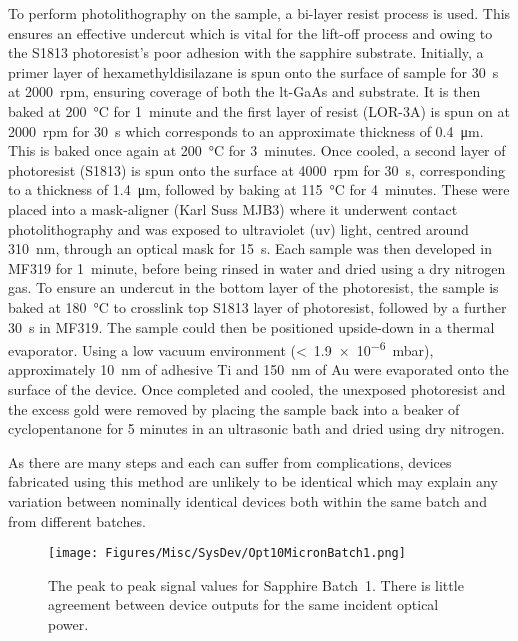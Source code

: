 To perform photolithography on the sample, a bi\nobreakdash-layer resist process is used. This ensures an effective undercut which is vital for the lift\nobreakdash-off process and owing to the S1813 photoresist's poor adhesion with the sapphire substrate. Initially, a primer layer of hexamethyldisilazane is spun onto the surface of sample for \SI{30}{s} at \SI{2000}{rpm}, ensuring coverage of both the \acrshort{lt}\nobreakdash-GaAs and substrate. It is then baked at \SI{200}{\celsius} for \SI{1}{minute} and the first layer of resist (LOR\nobreakdash-3A) is spun on at \SI{2000}{rpm} for \SI{30}{s} which corresponds to an approximate thickness of \SI{0.4}{\micro\metre}. This is baked once again at \SI{200}{\celsius} for \SI{3}{minutes}. Once cooled, a second layer of photoresist (S1813) is spun onto the surface at \SI{4000}{rpm} for \SI{30}{s}, corresponding to a thickness of \SI{1.4}{\micro\metre}, followed by baking at \SI{115}{\celsius} for \SI{4}{minutes}. These were placed into a mask\nobreakdash-aligner (Karl Suss MJB3) where it underwent contact photolithography and was exposed to ultraviolet (\acrshort{uv}) light, centred around \SI{310}{nm}, through an optical mask for \SI{15}{s}. Each sample was then developed in MF319 for \SI{1}{minute}, before being rinsed in water and dried using a dry nitrogen gas. 
To ensure an undercut in the bottom layer of the photoresist, the sample is baked at \SI{180}{\celsius} to crosslink top S1813 layer of photoresist, followed by a further \SI{30}{s} in MF319. The sample could then be positioned upside\nobreakdash-down in a thermal evaporator. Using a low vacuum environment (<~\SI{1.9e-6}{mbar}), approximately \SI{10}{nm} of adhesive Ti and \SI{150}{nm} of Au were evaporated onto the surface of the device. Once completed and cooled, the unexposed photoresist and the excess gold were removed by placing the sample back into a beaker of cyclopentanone for 5 minutes in an ultrasonic bath and dried using dry nitrogen.

As there are many steps and each can suffer from complications, devices fabricated using this method are unlikely to be identical which may explain any variation between nominally identical devices both within the same batch and from different batches.

\begin{figure}[h!]
    \centering
    \texttt{[image: Figures/Misc/SysDev/Opt10MicronBatch1.png]}
    \captionsetup{font = footnotesize, justification = centering}
    \caption[The Peak to Peak Signal Values for Sapphire Batch~1]{The peak to peak signal values for Sapphire Batch~1. There is little agreement between device outputs for the same incident optical power.}
    \label{fig:sapphbatch1}
\end{figure}

